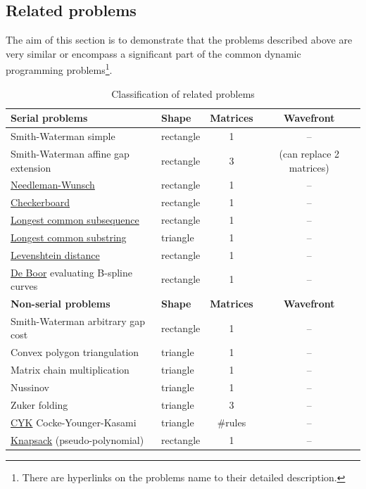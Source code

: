 \newpage
\subsection{Related problems}
The aim of this section is to demonstrate that the problems described above are very similar or encompass a significant part of the common dynamic programming problems\footnote{There are hyperlinks on the problems name to their detailed description.}.

\begin{table}[H]\begin{center}\begin{tabular}{llcc} \toprule
\bf Serial problems & \bf Shape & \bf Matrices & \bf Wavefront \\ \midrule
Smith-Waterman \footnotesize simple & rectangle & 1 & -- \\
Smith-Waterman \footnotesize affine gap extension & rectangle & 3 & (can replace 2 matrices) \\
\href{http://en.wikipedia.org/wiki/Needleman-Wunsch_algorithm}{Needleman-Wunsch} & rectangle & 1 & -- \\
\href{http://en.wikipedia.org/wiki/Dynamic_programming#Checkerboard}{Checkerboard} & rectangle & 1 & -- \\
\href{http://en.wikipedia.org/wiki/Longest_common_subsequence_problem\#Code_for_the_dynamic_programming_solution}{Longest common subsequence} & rectangle & 1 & -- \\
\href{http://en.wikipedia.org/wiki/Longest_common_substring_problem\#Pseudocode}{Longest common substring} & triangle & 1 & -- \\
\href{http://en.wikipedia.org/wiki/Levenshtein_distance\#Computing_Levenshtein_distance}{Levenshtein distance} & rectangle & 1 & -- \\
\href{http://en.wikipedia.org/wiki/De_Boor's_algorithm}{De Boor} \footnotesize evaluating B-spline curves & rectangle & 1 & -- \vspace{.4cm} \\
\toprule
\bf Non-serial problems & \bf Shape & \bf Matrices & \bf Wavefront \\ \midrule
Smith-Waterman \footnotesize arbitrary gap cost & rectangle & 1 & -- \\
Convex polygon triangulation & triangle & 1 & -- \\
Matrix chain multiplication & triangle & 1 & -- \\
Nussinov & triangle & 1 & -- \\
Zuker folding & triangle & 3 & -- \\
\href{http://en.wikipedia.org/wiki/CYK_algorithm}{CYK} \footnotesize Cocke-Younger-Kasami & triangle & \#rules & -- \\
\href{http://en.wikipedia.org/wiki/Knapsack_problem#Dynamic_programming}{Knapsack} \footnotesize (pseudo-polynomial) & rectangle & 1 & --\\
\end{tabular}\end{center}
\caption{Classification of related problems}
\end{table}

